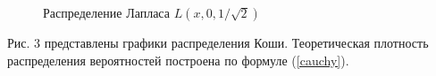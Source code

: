 \documentclass[12pt]{article}
\newcommand{\lskip}{\hfill\break}
\begin{document}
\begin{flushleft}
\begin{figure}[h!]
\begin{minipage}[h]{0.325\linewidth}
        \end{minipage}
        \caption{Распределение Лапласа $L(x, 0, 1/\sqrt{2})$}
    \end{figure}
    \lskip

     Рис. 3 представлены графики распределения Коши. Теоретическая плотность распределения вероятностей построена по формуле (\ref{cauchy}).


\end{flushleft}
\end{document}
